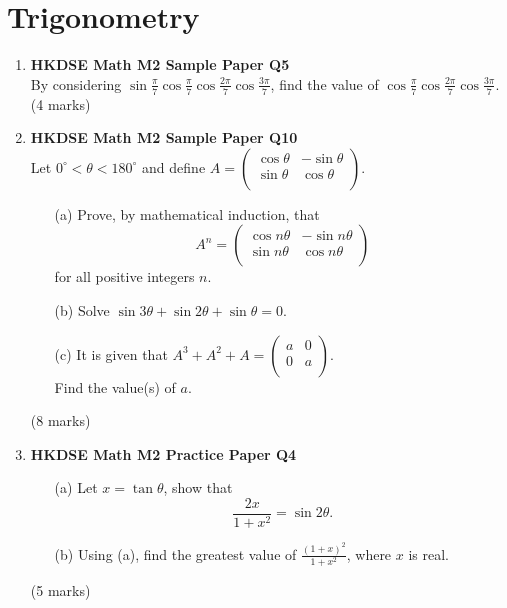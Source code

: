 \documentclass{report}
\begin{document}
\chapter{Trigonometry}
\begin{enumerate}
	\item \textbf{HKDSE Math M2 Sample Paper Q5}\\
	By considering $\displaystyle\sin{\frac{\pi}{7}}\cos{\frac{\pi}{7}}\cos{\frac{2\pi}{7}}\cos{\frac{3\pi}{7}}$, find the value of $\displaystyle\cos{\frac{\pi}{7}}\cos{\frac{2\pi}{7}}\cos{\frac{3\pi}{7}}$. \\(4 marks)

	\item \textbf{HKDSE Math M2 Sample Paper Q10}\\
	Let $0^{\circ} < \theta < 180^{\circ}$ and define $A = \begin{pmatrix}\cos{\theta}&-\sin{\theta}\\\sin{\theta}&\cos{\theta}\\\end{pmatrix}$. 
	\begin{enumerate}
		\item [(a)]Prove, by mathematical induction, that
		$$A^n = \begin{pmatrix}\cos{n\theta}&-\sin{n\theta}\\\sin{n\theta}&\cos{n\theta}\\\end{pmatrix}$$ for all positive integers $n$.
		\item [(b)]Solve $\sin{3\theta} + \sin{2\theta} + \sin{\theta} = 0$.
		\item [(c)]It is given that $A^3 + A^2 + A = \begin{pmatrix}a&0\\0&a\\\end{pmatrix}$.\\Find the value(s) of $a$. 
	\end{enumerate}
	(8 marks)

	\item \textbf{HKDSE Math M2 Practice Paper Q4}
	\begin{enumerate}
		\item [(a)]Let $x = \tan{\theta}$, show that $$\displaystyle\frac{2x}{1+x^2} = \sin{2\theta}.$$ 
		\item [(b)]Using (a), find the greatest value of $\displaystyle\frac{(1+x)^2}{1+x^2}$, where $x$ is real.
	\end{enumerate}
	(5 marks)


\end{enumerate}
\end{document}

